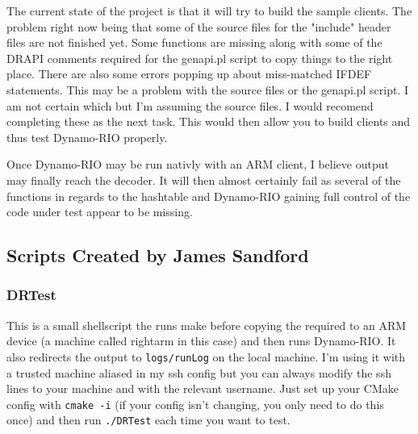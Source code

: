 \documentclass[a4paper]{article}
\begin{document}
The current state of the project is that it will try to build the sample
clients. The problem right now being that some of the source files for the
"include" header files are not finished yet. Some functions are missing along
with some of the DRAPI comments required for the genapi.pl script to copy things
to the right place. There are also some errors popping up about miss-matched
IFDEF statements. This may be a problem with the source files or the genapi.pl
script. I am not certain which but I'm assuming the source files. I would
recomend completing these as the next task. This would then allow you to build
clients and thus test Dynamo-RIO properly. 

Once Dynamo-RIO may be run nativly with an ARM client, I believe output may
finally reach the decoder. It will then almost certainly fail as several of the
functions in regards to the hashtable and Dynamo-RIO gaining full control of the
code under test appear to be missing.

\subsection{Scripts Created by James Sandford}
\subsubsection{DRTest}
This is a small shellscript the runs make before copying the required to an ARM
device (a machine called rightarm in this case) and then runs Dynamo-RIO. It
also redirects the output to \texttt{logs/runLog} on the local machine. I'm
using it with a trusted machine aliased in my ssh config but you can always
modify the ssh lines to your machine and with the relevant username. Just set up
your CMake config with \texttt{cmake -i} (if your config isn't changing, you
only need to do this once) and then run \texttt{./DRTest} each time you want to
test.
\end{document}
